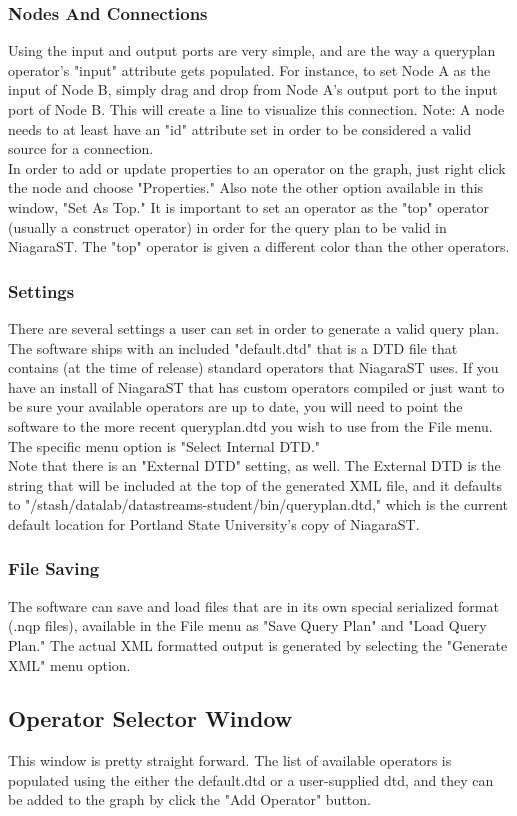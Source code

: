 \documentclass{article}
\begin{document}
\subsubsection{Nodes And Connections}  Using the input and output ports are very simple, and are the way a queryplan operator's "input" attribute gets populated.  For instance, to set Node A as the input of Node B, simply drag and drop from Node A's output port to the input port of Node B.  This will create a line to visualize this connection.  Note: A node needs to at least have an "id" attribute set in order to be considered a valid source for a connection.\\
In order to add or update properties to an operator on the graph, just right click the node and choose "Properties."  Also note the other option available in this window, "Set As Top."  It is important to set an operator as the "top" operator (usually a construct operator) in order for the query plan to be valid in NiagaraST.  The "top" operator is given a different color than the other operators.
\subsubsection {Settings}  There are several settings a user can set in order to generate a valid query plan.  The software ships with an included "default.dtd" that is a DTD file that contains (at the time of release) standard operators that NiagaraST uses.  If you have an install of NiagaraST that has custom operators compiled or just want to be sure your available operators are up to date, you will need to point the software to the more recent queryplan.dtd you wish to use from the File menu.  The specific menu option is "Select Internal DTD."\\
Note that there is an "External DTD" setting, as well.  The External DTD is the string that will be included at the top of the generated XML file, and it defaults to "/stash/datalab/datastreams-student/bin/queryplan.dtd," which is the current default location for Portland State University's copy of NiagaraST.
\subsubsection{File Saving}The software can save and load files that are in its own special serialized format (.nqp files), available in the File menu as "Save Query Plan" and "Load Query Plan."  The actual XML formatted output is generated by selecting the "Generate XML" menu option.
\subsection{Operator Selector Window}  This window is pretty straight forward.  The list of available operators is populated using the either the default.dtd or a user-supplied dtd, and they can be added to the graph by click the "Add Operator" button.
\end{document}
